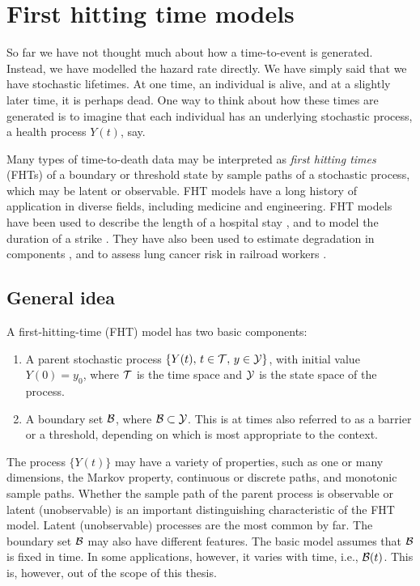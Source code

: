 \section{First hitting time models}\label{sec:FHT}
So far we have not thought much about how a time-to-event is generated. Instead, we have modelled the hazard rate directly. We have simply said that we have stochastic lifetimes. At one time, an individual is alive, and at a slightly later time, it is perhaps dead. One way to think about how these times are generated is to imagine that each individual has an underlying stochastic process, a health process $Y(t)$, say.

Many types of time-to-death data may be interpreted as \textit{first hitting times} (FHTs) of a boundary or threshold state by sample paths of a stochastic process, which may be latent or observable. FHT models have a long history of application in diverse fields, including medicine and engineering. FHT models have been used to describe the length of a hospital stay \citep{whitmore1975,eaton-whitmore}, and to model the duration of a strike \citep{lancaster}. They have also been used to estimate degradation in components \citep{whitmore1995}, and to assess lung cancer risk in railroad workers \citep{leewhitmore2004}.

\subsection{General idea}\label{fht-idea}
A first-hitting-time (FHT) model has two basic components:
\begin{enumerate}
\item A parent stochastic process $\{Y(t),\,t\in\mathcal{T},\,y\in\mathcal{Y}\}$, with initial value $Y(0)=y_0$, where $\mathcal{T}$ is the time space and $\mathcal{Y}$ is the state space of the process.
\item A boundary set $\mathcal{B}$, where $\mathcal{B}\subset\mathcal{Y}$. This is at times also referred to as a barrier or a threshold, depending on which is most appropriate to the context.
\end{enumerate}
The process $\{Y(t)\}$ may have a variety of properties, such as one or many dimensions, the Markov property, continuous or discrete paths, and monotonic sample paths. Whether the sample path of the parent process is observable or latent (unobservable) is an important distinguishing characteristic of the FHT model. Latent (unobservable) processes are the most common by far. The boundary set $\mathcal{B}$ may also have different features. The basic model assumes that $\mathcal{B}$ is fixed in time. In some applications, however, it varies with time, i.e., $\mathcal{B}(t)$. This is, however, out of the scope of this thesis.

